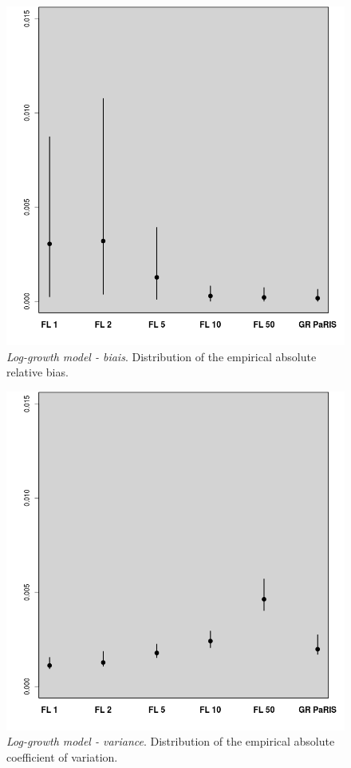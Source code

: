 \documentclass[12pt]{article}
\newcommand{\1}{\mathrm{1}}
\begin{document}
\begin{figure}[p]
\centering
\includegraphics[scale=0.5]{res_mult_LG_bias}
\caption{{\em Log-growth model - biais}. 
Distribution of the empirical absolute relative bias.}
\label{fig:mult:LG:b}
\end{figure}

\begin{figure}[p]
\centering
\includegraphics[scale=0.5]{res_mult_LG_cv}
\caption{{\em Log-growth model - variance}.
 Distribution of the empirical absolute coefficient of variation.}
\label{fig:mult:LG:cv}
\end{figure}
\end{document}
